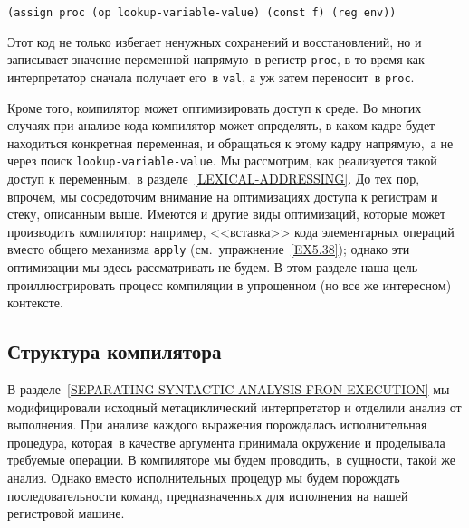 \begin{Verbatim}[fontsize=\small]
(assign proc (op lookup-variable-value) (const f) (reg env))
\end{Verbatim}
Этот код не только избегает ненужных сохранений и восстановлений, но и
записывает значение переменной напрямую~в регистр {\tt proc}, в
то время как интерпретатор сначала получает его~в {\tt val}, а
уж затем переносит~в {\tt proc}.

Кроме того, компилятор может оптимизировать доступ к
среде.  Во многих случаях при анализе кода компилятор может определять, в
каком кадре будет находиться конкретная переменная, и обращаться к
этому кадру напрямую,~а не через поиск
{\tt lookup-variable-value}.  Мы рассмотрим, как реализуется такой
доступ к переменным,~в разделе~\ref{LEXICAL-ADDRESSING}.
До тех пор, впрочем, мы сосредоточим внимание на оптимизациях доступа
к регистрам и стеку, описанным выше.  Имеются и другие виды
оптимизаций, которые может производить компилятор: например,
<<вставка>> кода элементарных операций вместо общего механизма
{\tt apply} (см.~упражнение~\ref{EX5.38}); однако
эти оптимизации мы здесь рассматривать не будем.  В этом разделе наша цель
--- проиллюстрировать процесс компиляции в
упрощенном (но все же интересном) контексте.

\subsection{Структура компилятора}
\label{STRUCTURE-OF-THE-COMPILER}


В разделе~\ref{SEPARATING-SYNTACTIC-ANALYSIS-FRON-EXECUTION} мы
модифицировали исходный метациклический интерпретатор и отделили
анализ от выполнения.  При анализе каждого выражения порождалась
исполнительная процедура, которая~в качестве аргумента принимала
окружение и проделывала требуемые операции.  В компиляторе мы будем
проводить,~в сущности, такой же анализ.  Однако вместо
исполнительных процедур мы будем порождать последовательности команд,
предназначенных для исполнения на нашей регистровой машине.

